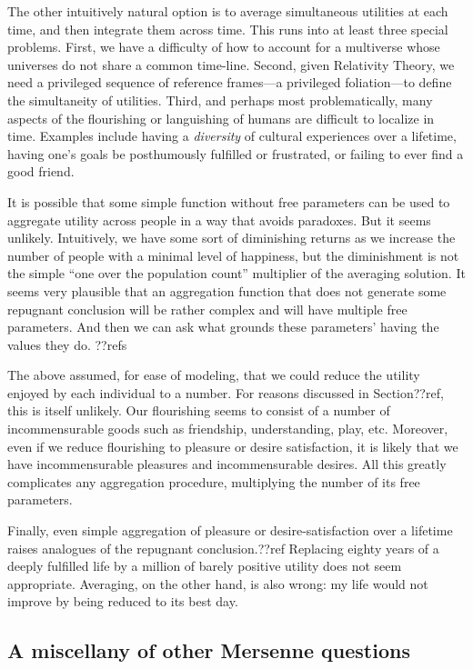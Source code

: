The other intuitively natural option is to average simultaneous utilities at each time, and then integrate them across time. This runs into
at least three special problems. First, we have a difficulty of how to account for a multiverse whose universes do not share a 
common time-line. Second, given Relativity Theory, we need a privileged sequence of reference frames---a privileged foliation---to define the 
simultaneity of utilities. Third, and perhaps most problematically, many aspects of the flourishing or languishing of 
humans are difficult to localize in time. Examples include having a \textit{diversity} of cultural experiences over a lifetime, having 
one's goals be posthumously fulfilled or frustrated, or failing to ever find a good friend.


It is possible that some simple function without free parameters can be used to aggregate utility across people in a way that
avoids paradoxes. But it seems unlikely. Intuitively, we have some sort of diminishing returns as we increase the number of
people with a minimal level of happiness, but the diminishment is not the simple ``one over the population count'' multiplier of
the averaging solution. It seems very plausible that an aggregation function that does not generate some repugnant conclusion will
be rather complex and will have multiple free parameters. And then we can ask what grounds these parameters' having the values they
do. ??refs


The above assumed, for ease of modeling, that we could reduce the utility enjoyed by each individual to a number. For reasons 
discussed in Section??ref, this is itself unlikely. Our flourishing seems to consist of a number of incommensurable goods such 
as friendship, understanding, play, etc. Moreover, even if we reduce flourishing to pleasure or desire satisfaction, it is 
likely that we have incommensurable pleasures and incommensurable desires. All this greatly complicates any aggregation procedure,
multiplying the number of its free parameters. 

Finally, even simple aggregation of pleasure or desire-satisfaction over a lifetime raises analogues of the 
repugnant conclusion.??ref Replacing eighty years of a deeply fulfilled life by a million of barely positive
utility does not seem appropriate. Averaging, on the other hand, is also wrong: my life would not improve by
being reduced to its best day. 

\subsection{A miscellany of other Mersenne questions}
